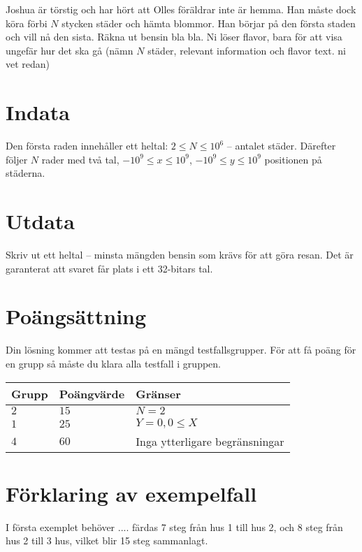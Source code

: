 Joshua är törstig och har hört att Olles föräldrar inte är hemma. Han måste dock köra förbi $N$ stycken städer och hämta blommor. Han börjar på den första staden och
vill nå den sista. Räkna ut bensin bla bla. Ni löser flavor, bara för att visa ungefär hur det ska gå (nämn $N$ städer, relevant information och flavor text. ni vet redan)


\section*{Indata}
Den första raden innehåller ett heltal: $2\leq N \leq 10^6$ -- antalet städer. 
Därefter följer $N$ rader med två tal, $-10^9 \leq x \leq 10^9$, $-10^9 \leq y \leq 10^9$ positionen på städerna.


\section*{Utdata}
Skriv ut ett heltal -- minsta mängden bensin som krävs för att göra resan. Det är garanterat att svaret får plats i ett 32-bitars tal.

\section*{Poängsättning}
Din lösning kommer att testas på en mängd testfallsgrupper.
För att få poäng för en grupp så måste du klara alla testfall i gruppen.

\noindent
\begin{tabular}{| l | l | p{12cm} |}
  \hline
  Grupp & Poängvärde & Gränser \\ \hline
  $2$   & $15$       & $N=2$ \\ \hline
  $1$   & $25$       & $Y=0, 0 \leq X$ \\ \hline
  $4$   & $60$       & Inga ytterligare begränsningar  \\ \hline
\end{tabular}

\section*{Förklaring av exempelfall}
I första exemplet behöver .... färdas 7 steg från hus 1 till hus 2, och 8 steg från hus 2 till 3 hus, vilket blir 15 steg sammanlagt.
